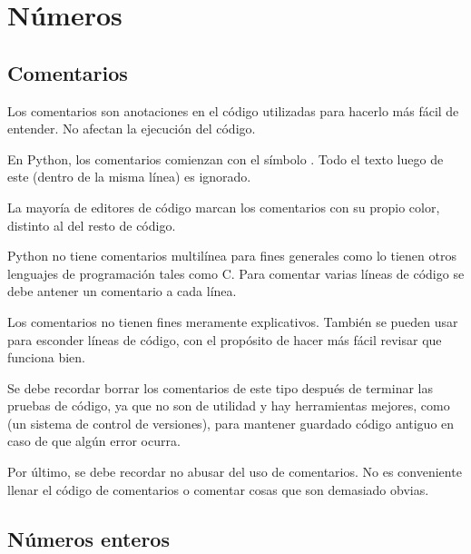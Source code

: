 \chapter{Números}

\section{Comentarios}

Los comentarios son anotaciones en el código utilizadas para hacerlo más fácil de entender.
No afectan la ejecución del código.

En Python, los comentarios comienzan con el símbolo \ttt{\#}.
Todo el texto luego de este \ttt{\#} (dentro de la misma línea) es ignorado.


La mayoría de editores de código marcan los comentarios con su propio color, distinto al del resto de código.


Python no tiene comentarios multilínea para fines generales como lo tienen otros lenguajes de programación tales como C.
Para comentar varias líneas de código se debe antener un comentario a cada línea.


Los comentarios no tienen fines meramente explicativos.
También se pueden usar para esconder líneas de código, con el propósito de hacer más fácil revisar que funciona bien.


Se debe recordar borrar los comentarios de este tipo después de terminar las pruebas de código, ya que no son de utilidad y hay herramientas mejores, como  (un sistema de control de versiones), para mantener guardado código antiguo en caso de que algún error ocurra.

Por último, se debe recordar no abusar del uso de comentarios.
No es conveniente llenar el código de comentarios o comentar cosas que son demasiado obvias.


\section{Números enteros}


